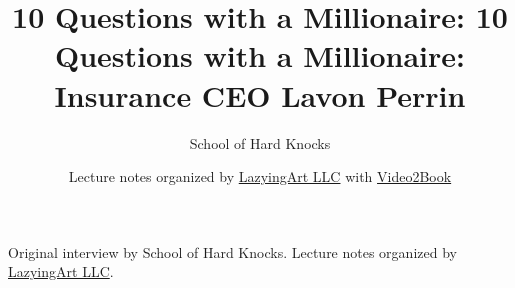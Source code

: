 \documentclass[11pt,oneside]{book}
\begin{document}
\frontmatter
\title{10 Questions with a Millionaire: 10 Questions with a Millionaire: Insurance CEO Lavon Perrin}
\author{School of Hard Knocks}
\date{Lecture notes organized by \href{https://lazying.art}{LazyingArt LLC} with \href{https://github.com/lachlanchen/Video2Book}{Video2Book}}
\maketitle
\begin{center}
\small Original interview by School of Hard Knocks. Lecture notes organized by \href{https://lazying.art}{LazyingArt LLC}.
\end{center}
\clearpage
\mainmatter

\end{document}
